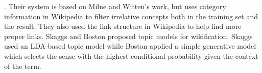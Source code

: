 \cite{fernando2012adapting}.
Their system is based on Milne and Witten's work, but uses category information
in Wikipedia to filter irrelative concepts both in the training set and the result.
They also used the link structure in Wikipedia to help find more proper links.
Skaggs \cite{skaggs2011topic} and Boston \cite{Boston:2012} proposed topic
models for wikification. Skaggs used an LDA-based topic model while
Boston applied a simple generative model which selects the sense
with the highest conditional probability given the context of the term.




